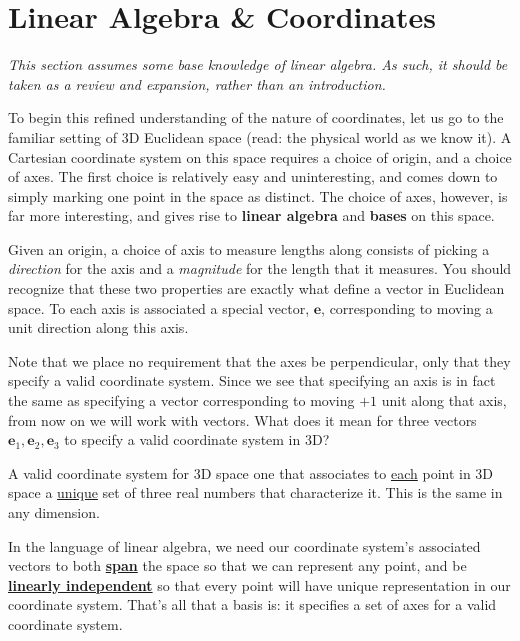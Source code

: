 \documentclass[../master.tex]{subfiles}
\begin{document}
	
	\section{Linear Algebra \& Coordinates} 
	\label{sec:Linear Algebra & Coordinates}%
	

	\begin{center}
		\small{\emph{This section assumes some base knowledge of linear algebra. As such, it should be taken as a review and expansion, rather than an introduction.}}
	\end{center}
	
	To begin this refined understanding of the nature of coordinates, let us go to the familiar setting of 3D Euclidean space (read: the physical world as we know it). A Cartesian coordinate system on this space requires a choice of origin, and a choice of axes. The first choice is relatively easy and uninteresting, and comes down to simply marking one point in the space as distinct. The choice of axes, however, is far more interesting, and gives rise to \textbf{linear algebra} and \textbf{bases} on this space.
	
	Given an origin, a choice of axis to measure lengths along consists of picking a \emph{direction} for the axis and a \emph{magnitude} for the length that it measures. You should recognize that these two properties are exactly what define a vector in Euclidean space. To each axis is associated a special vector, $\mathbf e$, corresponding to moving a unit direction along this axis.
	
	
	Note that we place no requirement that the axes be perpendicular, only that they specify a valid coordinate system. Since we see that specifying an axis is in fact the same as specifying a vector corresponding to moving $+1$ unit along that axis, from now on we will work with vectors. What does it mean for three vectors $\mathbf e_1, \mathbf e_2, \mathbf e_3$ to specify a valid coordinate system in 3D? 
	
	A valid coordinate system for 3D space one that associates to \underline{each} point in 3D space a \underline{unique} set of three real numbers that characterize it. This is the same in any dimension.
	
	In the language of linear algebra, we need our coordinate system's associated vectors to both \underline{\textbf{span}} the space so that we can represent any point, and be \underline{\textbf{linearly independent}} so that every point will have unique representation in our coordinate system. That's all that a basis is: it specifies a set of axes for a valid coordinate system.
	
\end{document}
